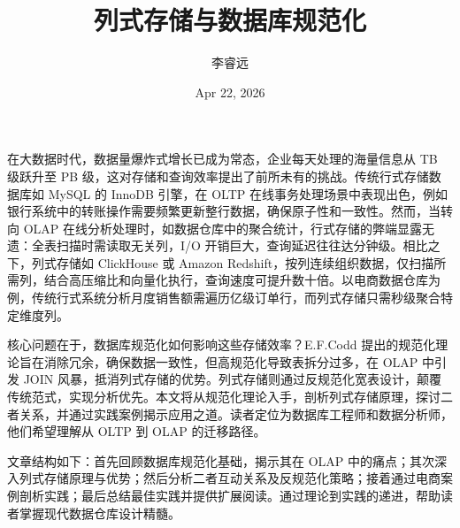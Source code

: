 \title{列式存储与数据库规范化}
\author{李睿远}
\date{Apr 22, 2026}
\maketitle
在大数据时代，数据量爆炸式增长已成为常态，企业每天处理的海量信息从 TB 级跃升至 PB 级，这对存储和查询效率提出了前所未有的挑战。传统行式存储数据库如 MySQL 的 InnoDB 引擎，在 OLTP 在线事务处理场景中表现出色，例如银行系统中的转账操作需要频繁更新整行数据，确保原子性和一致性。然而，当转向 OLAP 在线分析处理时，如数据仓库中的聚合统计，行式存储的弊端显露无遗：全表扫描时需读取无关列，I/O 开销巨大，查询延迟往往达分钟级。相比之下，列式存储如 ClickHouse 或 Amazon Redshift，按列连续组织数据，仅扫描所需列，结合高压缩比和向量化执行，查询速度可提升数十倍。以电商数据仓库为例，传统行式系统分析月度销售额需遍历亿级订单行，而列式存储只需秒级聚合特定维度列。\par
核心问题在于，数据库规范化如何影响这些存储效率？E.F.Codd 提出的规范化理论旨在消除冗余，确保数据一致性，但高规范化导致表拆分过多，在 OLAP 中引发 JOIN 风暴，抵消列式存储的优势。列式存储则通过反规范化宽表设计，颠覆传统范式，实现分析优先。本文将从规范化理论入手，剖析列式存储原理，探讨二者关系，并通过实践案例揭示应用之道。读者定位为数据库工程师和数据分析师，他们希望理解从 OLTP 到 OLAP 的迁移路径。\par
文章结构如下：首先回顾数据库规范化基础，揭示其在 OLAP 中的痛点；其次深入列式存储原理与优势；然后分析二者互动关系及反规范化策略；接着通过电商案例剖析实践；最后总结最佳实践并提供扩展阅读。通过理论到实践的递进，帮助读者掌握现代数据仓库设计精髓。\par
